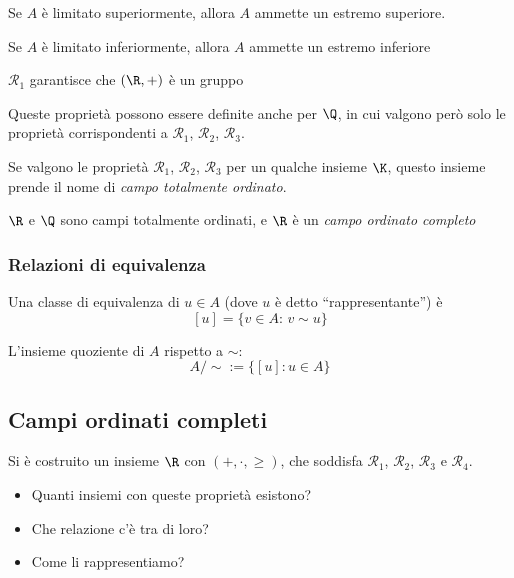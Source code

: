 \begin{itemize}
    Se $ A $ è limitato superiormente, allora $ A $ ammette un estremo superiore.
    
    Se $ A $ è limitato inferiormente, allora $ A $ ammette un estremo inferiore

\end{itemize}

$ \mathcal{R}_1 $ garantisce che $ (\R, +) $ è un gruppo

Queste proprietà possono essere definite anche per $ \Q $, in cui valgono però solo le proprietà corrispondenti a $ \mathcal{R}_1 $, $ \mathcal{R}_2 $, $ \mathcal{R}_3 $.

Se valgono le proprietà $ \mathcal{R}_1 $, $ \mathcal{R}_2 $, $ \mathcal{R}_3 $ per un qualche insieme $ \K $, questo insieme prende il nome di \textit{campo totalmente ordinato}.

$ \R $ e $ \Q $ sono campi totalmente ordinati, e $ \R $ è un \textit{campo ordinato completo}

\subsubsection{Relazioni di equivalenza}


Una classe di equivalenza di $ u \in A $ (dove $ u $ è detto ``rappresentante'') è
\[
    [u]=\{v \in A:\, v \sim u\}
\]

L'insieme quoziente di $ A $ rispetto a $ \sim $: \[
    A/\sim := \{[u]: u \in A\}
\]

\subsection{Campi ordinati completi}

Si è costruito un insieme $ \R $ con $ (+, \cdot, \ge) $, che soddisfa $ \mathcal{R}_1 $, $ \mathcal{R}_2 $, $ \mathcal{R}_3 $ e $ \mathcal{R}_4 $.
\begin{itemize}
    \item Quanti insiemi con queste proprietà esistono?
    \item Che relazione c'è tra di loro?
    \item Come li rappresentiamo?
\end{itemize}

